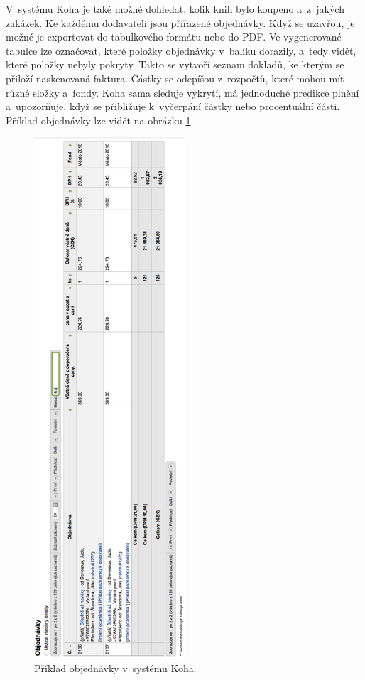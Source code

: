 \documentclass[
	11pt, oneside, printed, final, palatino
	microtype,
	table,   %
	lof,     %
	lot     %
]{fithesis3}
\begin{document}
{V~systému Koha je také možné dohledat, kolik knih bylo koupeno a~z~jakých zakázek. Ke každému dodavateli jsou přiřazené objednávky. Když se uzavřou, je možné je exportovat do tabulkového formátu nebo do PDF. Ve vygenerované tabulce lze označovat, které položky objednávky v~balíku dorazily, a~tedy vidět, které položky nebyly pokryty. Takto se vytvoří seznam dokladů, ke kterým se přiloží naskenovaná faktura. Částky se odepíšou z~rozpočtů, které mohou mít různé složky a~fondy. Koha sama sleduje vykrytí, má jednoduché predikce plnění a~upozorňuje, když se přibližuje k~vyčerpání částky nebo procentuální části. Příklad objednávky lze vidět na obrázku \ref{fig:objednavka}.

\begin{figure}
    \centering
    \includegraphics[width=0.5\textwidth]{resources/objednavka_left}
    \caption{Příklad objednávky v~systému Koha.}
    \label{fig:objednavka}
\end{figure}

}
\end{document}
